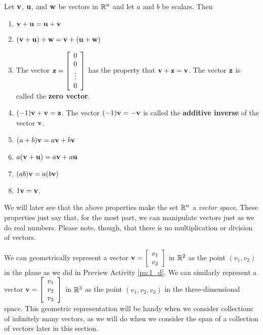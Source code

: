 \begin{theorem} \label{thm:vector_properties} Let $\mathbf{v}$, $\mathbf{u}$, and $\mathbf{w}$ be vectors in $\mathbb{R}^n$ and let $a$ and $b$ be scalars. Then
\begin{enumerate}
\item $\mathbf{v} + \mathbf{u} = \mathbf{u} + \mathbf{v}$
\item $(\mathbf{v} + \mathbf{u}) + \mathbf{w} = \mathbf{v} + (\mathbf{u} + \mathbf{w})$
\item The vector $\mathbf{z} = \left[ \begin{array}{c} 0 \\ 0 \\ \vdots \\ 0 \end{array} \right]$ has the property that $\mathbf{v} + \mathbf{z} = \mathbf{v}$. The vector $\mathbf{z}$ is called the \textbf{zero vector}.
\item  $(-1)\mathbf{v} + \mathbf{v} = \mathbf{z}$. The vector $(-1)\mathbf{v} = -\mathbf{v}$ is called the \textbf{additive inverse} of the vector $\mathbf{v}$.
\item $(a+b) \mathbf{v} = a\mathbf{v} + b\mathbf{v}$
\item $a(\mathbf{v} + \mathbf{u}) = a\mathbf{v} + a\mathbf{u}$
\item $(ab) \mathbf{v} = a(b\mathbf{v})$
\item $1 \mathbf{v} = \mathbf{v}$.
\end{enumerate}
\end{theorem}



We will later see that the above properties make the set $\mathbb{R}^n$ a \emph{vector space}. These properties just say that, for the most part, we can manipulate vectors just as we do real numbers. Please note, though, that there is no multiplication or division of vectors. 

\label{sec:geom_vec_ops}

We can geometrically represent a vector $\mathbf{v} = \left[ \begin{array}{c} v_1\\ v_2\end{array} \right] $ in $\mathbb{R}^2$ as the point $(v_1, v_2)$ in the plane as we did in Preview Activity \ref{pa:1_d}. We can similarly represent a vector $\mathbf{v} = \left[ \begin{array}{c} v_1\\ v_2\\ v_3 \end{array} \right]$ in $\mathbb{R}^3$ as the point $(v_1, v_2, v_3)$ in the three-dimensional space. This geometric representation will be handy when we consider collections of infinitely many vectors, as we will do when we consider the span of a collection of vectors later in this section.


